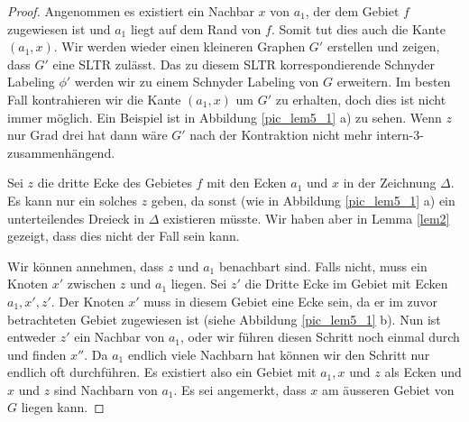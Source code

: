 \begin{proof}
Angenommen es existiert ein Nachbar $x$ von $a_1$, der dem Gebiet $f$ zugewiesen ist und $a_1$ liegt auf dem Rand von $f$. Somit tut dies auch die Kante $(a_1,x)$. Wir werden wieder einen kleineren Graphen $G'$ erstellen und zeigen, dass $G'$ eine SLTR zulässt. Das zu diesem SLTR korrespondierende Schnyder Labeling $\phi'$ werden wir zu einem Schnyder Labeling von $G$ erweitern. Im besten Fall kontrahieren wir die Kante $(a_1,x)$ um $G'$ zu erhalten, doch dies ist nicht immer möglich. Ein Beispiel ist in Abbildung \ref{pic_lem5_1} a) zu sehen. Wenn $z$ nur Grad drei hat dann wäre $G'$ nach der Kontraktion nicht mehr intern-3-zusammenhängend.

Sei $z$ die dritte Ecke des Gebietes $f$ mit den Ecken $a_1$ und $x$ in der Zeichnung $\Delta$. Es kann nur ein solches $z$ geben, da sonst (wie in Abbildung \ref{pic_lem5_1} a) ein unterteilendes Dreieck in $\Delta$ existieren müsste. Wir haben aber in Lemma \ref{lem2} gezeigt, dass dies nicht der Fall sein kann.

Wir können annehmen, dass $z$ und $a_1$ benachbart sind. Falls nicht, muss ein Knoten $x'$ zwischen $z$ und $a_1$ liegen. Sei $z'$ die Dritte Ecke im Gebiet mit Ecken $a_1,x',z'$. Der Knoten $x'$ muss in diesem Gebiet eine Ecke sein, da er im zuvor betrachteten Gebiet zugewiesen ist (siehe Abbildung \ref{pic_lem5_1} b). Nun ist entweder $z'$ ein Nachbar von $a_1$, oder wir führen diesen Schritt noch einmal durch und finden $x''$. Da $a_1$ endlich viele Nachbarn hat können wir den Schritt nur endlich oft durchführen. Es existiert also ein Gebiet mit $a_1, x$ und $z$ als Ecken und $x$ und $z$ sind Nachbarn von $a_1$. Es sei angemerkt, dass $x$ am äusseren Gebiet von $G$ liegen kann.


\end{proof}
